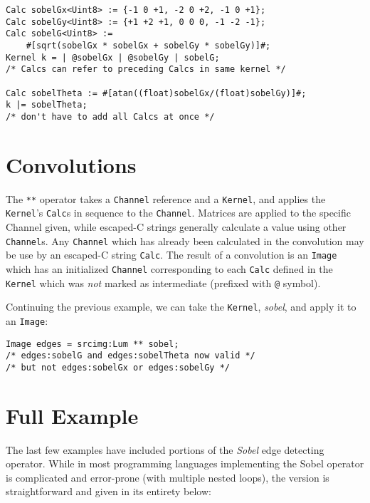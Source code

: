\begin{lstlisting}[language=CLAM,escapechar=\%]
Calc sobelGx<Uint8> := {-1 0 +1, -2 0 +2, -1 0 +1};
Calc sobelGy<Uint8> := {+1 +2 +1, 0 0 0, -1 -2 -1};
Calc sobelG<Uint8> :=
    #[sqrt(sobelGx * sobelGx + sobelGy * sobelGy)]#;
Kernel k = | @sobelGx | @sobelGy | sobelG;
/* Calcs can refer to preceding Calcs in same kernel */

Calc sobelTheta := #[atan((float)sobelGx/(float)sobelGy)]#;
k |= sobelTheta; 
/* don't have to add all Calcs at once */
\end{lstlisting}

\section{Convolutions}\label{sec:tutorial:convolutions}

The \texttt{**} operator takes a \texttt{Channel} reference and a \texttt{Kernel}, and
applies the \texttt{Kernel}'s \texttt{Calc}s in sequence to the \texttt{Channel}.
Matrices are applied to the specific Channel given,
while escaped-C strings generally calculate a value using other \texttt{Channel}s. Any \texttt{Channel} which has
already been calculated in the convolution may be use by an escaped-C string \texttt{Calc}.
The result of a convolution is an \texttt{Image} which has an initialized \texttt{Channel} corresponding to
each \texttt{Calc} defined in the \texttt{Kernel} which was \emph{not} marked as intermediate
(prefixed with \texttt{@} symbol).

Continuing the previous example, we can take the \texttt{Kernel}, \emph{sobel}, and apply it to an \texttt{Image}:

\begin{lstlisting}[language=CLAM,escapechar=\%]
Image edges = srcimg:Lum ** sobel;
/* edges:sobelG and edges:sobelTheta now valid */
/* but not edges:sobelGx or edges:sobelGy */
\end{lstlisting}

\section{Full Example}

The last few examples have included portions of the \emph{Sobel} edge detecting operator.
While in most programming languages implementing the Sobel operator
is complicated and error-prone (with multiple nested loops), the \sys{} version is straightforward and
given in its entirety below:



